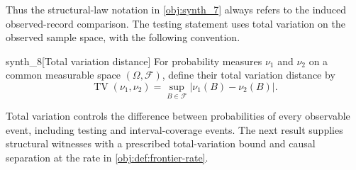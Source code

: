 \documentclass[11pt]{article}
\begin{document}
Thus the structural-law notation in \cref{obj:synth_7} always refers to the induced observed-record comparison. The testing statement uses total variation on the observed sample space, with the following convention.

\begin{definitionv}{synth_8}[Total variation distance]
For probability measures \(\nu_1\) and \(\nu_2\) on a common measurable space \((\Omega,\mathcal F)\), define their total variation distance by
\[
\operatorname{TV}(\nu_1,\nu_2)
=\sup_{B\in\mathcal F}\bigl|\nu_1(B)-\nu_2(B)\bigr|.
\]
\end{definitionv}

Total variation controls the difference between probabilities of every observable event, including testing and interval-coverage events. The next result supplies structural witnesses with a prescribed total-variation bound and causal separation at the rate in \cref{obj:def:frontier-rate}.
\end{document}
